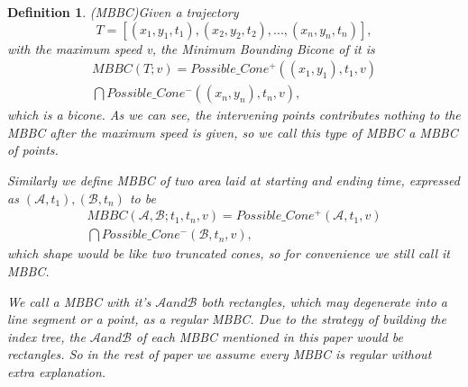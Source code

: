 \documentclass[sigplan]{acmart}
\newtheorem{myDef}{Definition}
\begin{document}
\begin{myDef}
(MBBC)Given a trajectory $$T=[(x_1,y_1,t_1), (x_2,y_2,t_2), ..., (x_n,y_n,t_n)],$$with the maximum speed v, the Minimum Bounding Bicone of it is
$$
\begin{aligned}
MBBC(T;v)=Possible\_Cone^+((x_1,y_1),t_1,v)\\
\bigcap Possible\_Cone^-((x_n,y_n),t_n,v),
\end{aligned}
$$
which is a bicone. As we can see, the intervening points contributes nothing to the MBBC after the maximum speed is given, so we call this type of MBBC a MBBC of points. %
\par
Similarly we define MBBC of two area laid at starting and ending time, expressed as $(\mathcal{A},t_1),(\mathcal{B},t_n)$ to be
$$
\begin{aligned}
MBBC(\mathcal{A},\mathcal{B};t_1,t_n,v)=Possible\_Cone^+(\mathcal{A},t_1,v)\\
\bigcap Possible\_Cone^-(\mathcal{B},t_n,v),
\end{aligned}
$$
which shape would be like two truncated cones, so for convenience we still call it MBBC. \par
We call a MBBC with it's $\mathcal{A} and \mathcal{B}$ both rectangles, which may degenerate into a line segment or a point, as a regular MBBC.
Due to the strategy of building the index tree, the $\mathcal{A} and \mathcal{B}$ of each MBBC mentioned in this paper would be rectangles. So in the rest of paper we assume every MBBC is regular without extra explanation.
\end{myDef}

\end{document}
